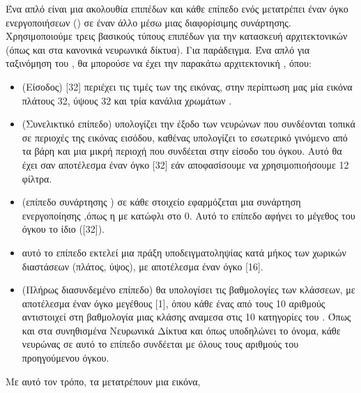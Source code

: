 
Ένα απλό  είναι μια ακολουθία επιπέδων και κάθε επίπεδο ενός  μετατρέπει έναν όγκο ενεργοποιήσεων () σε έναν άλλο μέσω μιας διαφορίσιμης συνάρτησης. Χρησιμοποιούμε τρεις βασικούς τύπους επιπέδων για την κατασκευή αρχιτεκτονικών  (όπως και στα κανονικά νευρωνικά δίκτυα). 
Για παράδειγμα. Ένα απλό  για ταξινόμηση του , θα μπορούσε να έχει την παρακάτω αρχιτεκτονική , όπου:

\begin{itemize}
\item {} (Είσοδος) [32] περιέχει τις τιμές των  της εικόνας, στην περίπτωση μας μία εικόνα πλάτους 32, ύψους 32 και τρία κανάλια χρωμάτων .
\item {} (Συνελικτικό επίπεδο) υπολογίζει την έξοδο των νευρώνων που συνδέονται τοπικά σε περιοχές της εικόνας εισόδου, καθένας υπολογίζει το εσωτερικό γινόμενο από τα βάρη και μια μικρή περιοχή που συνδέεται στην είσοδο του όγκου. Αυτό θα έχει σαν αποτέλεσμα έναν όγκο [32] εάν αποφασίσουμε να χρησιμοπιοήσουμε 12 φίλτρα.
\item {} (επίπεδο συνάρτησης ) σε κάθε στοιχείο εφαρμόζεται μια συνάρτηση ενεργοποίησης ,όπως η  με κατώφλι στο 0. Αυτό το επίπεδο αφήνει το μέγεθος του όγκου το ίδιο ([32]).
\item {} αυτό το επίπεδο εκτελεί μια πράξη υποδειγματοληψίας κατά μήκος των χωρικών διαστάσεων (πλάτος, ύψος), με αποτέλεσμα έναν όγκο [16].
\item {} (Πλήρως διασυνδεμένο επίπεδο) θα υπολογίσει τις βαθμολογίες των κλάσσεων, με αποτέλεσμα έναν όγκο μεγέθους [1], όπου κάθε ένας από τους 10 αριθμούς αντιστοιχεί στη βαθμολογία μιας κλάσης αναμεσα στις 10 κατηγορίες του . Όπως και στα συνηθισμένα Νευρωνικά Δίκτυα και όπως υποδηλώνει το όνομα, κάθε νευρώνας σε αυτό το επίπεδο συνδέεται με όλους τους αριθμούς του προηγούμενου όγκου.
\end{itemize}

Με αυτό τον τρόπο, τα  μετατρέπουν μια εικόνα, \\

